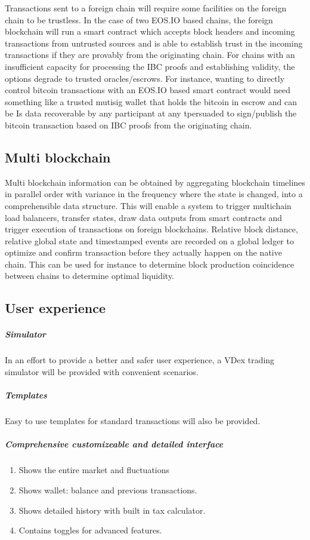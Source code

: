 \documentclass[]{article}
\begin{document}
	Transactions sent to a foreign chain will require some facilities on the foreign chain to be trustless. 
	In the case of two EOS.IO based chains, the foreign blockchain will run a smart contract which accepts block headers and incoming transactions from untrusted sources and is able to establish trust in the incoming transactions if they are provably from the originating chain. 
	For chains with an insufficient capacity for processing the IBC proofs and establishing validity, the options degrade to trusted oracles/escrows.
	For instance, wanting to directly control bitcoin transactions with an EOS.IO based smart contract would need something like a trusted mutisig wallet that holds the bitcoin in escrow and can be 	Is data recoverable by any participant at any tpersuaded to sign/publish the bitcoin transaction based on IBC proofs from the originating chain.\cite{3}
	
	
	\subsection{Multi blockchain}
	Multi blockchain information can be obtained by aggregating blockchain timelines in parallel order with variance in the frequency where the state is changed, into a comprehensible data structure.
	This will enable a system to trigger multichain load balancers, transfer states, draw data outputs from smart contracts and trigger execution of transactions on foreign blockchains. 
	Relative block distance, relative global state and timestamped events are recorded on a global ledger to optimize and confirm transaction before they actually happen on the native chain.
	This can be used for instance to determine block production coincidence between chains to determine optimal liquidity.\cite{20}
	
	\subsection{User experience}
	\subparagraph{Simulator}
	In an effort to provide a better and safer user experience, 
	a VDex trading simulator will be provided with convenient scenarios.
	\subparagraph{Templates}
	Easy to use templates for standard transactions will also be provided.
	\subparagraph{Comprehensive customizeable and detailed interface}
	\begin{enumerate}
		\item Shows the entire market and fluctuations
		\item Shows wallet: balance and previous transactions.
		\item Shows detailed history with built in tax calculator.
		\item Contains toggles for advanced features.		 
	\end{enumerate}
	
\end{document}
